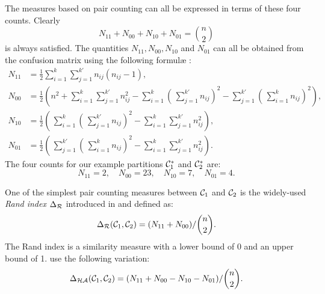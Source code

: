 The measures based on pair counting can all be expressed in terms of these
four counts.  Clearly \[N_{11}+N_{00}+N_{10}+N_{01} = \binom{n}{2}\] is always
satisfied.  The quantities $N_{11},N_{00},N_{10}$ and $N_{01}$ can all be
obtained from the confusion matrix using the following formul\ae
\citep{hubert-arabie-1985}:
\begin{align*}
  N_{11} &= \frac{1}{2} \sum_{i=1}^{k} \sum_{j=1}^{k'} n_{ij}(n_{ij}-1),\\
  N_{00} &= \frac{1}{2} \left(n^2 + \sum_{i=1}^{k} \sum_{j=1}^{k'} n_{ij}^2
                             - \sum_{i=1}^{k}
                                \left(\,\sum_{j=1}^{k'} n_{ij} \right)^2
                             - \sum_{j=1}^{k'}
                                \left(\,\sum_{i=1}^{k} n_{ij} \right)^2
                       \right),\\
  N_{10} &= \frac{1}{2} \left(\,\sum_{i=1}^{k}
                              \left(\,\sum_{j=1}^{k'} n_{ij} \right)^2
                             - \sum_{i=1}^{k} \sum_{j=1}^{k'} n_{ij}^2
                       \right),\\
  N_{01} &= \frac{1}{2} \left(\,\sum_{j=1}^{k'}
                              \left(\,\sum_{i=1}^{k} n_{ij} \right)^2
                             - \sum_{i=1}^{k} \sum_{j=1}^{k'} n_{ij}^2
                       \right).
\end{align*}
The four counts for our example partitions $\mathcal{C}^*_1$ and $\mathcal{C}^*_2$ are:
\begin{equation*}
  N_{11} = 2,\quad
  N_{00} = 23,\quad
  N_{10} = 7,\quad
  N_{01} = 4.
\end{equation*}

One of the simplest pair counting measures between $\mathcal{C}_1$ and $\mathcal{C}_2$ is
the widely-used \textit{Rand index} $\Delta_{\mathcal{R}}$ introduced in
\citep{rand-1971} and defined as:
\begin{equation*}
\Delta_{\mathcal{R}}(\mathcal{C}_1,\mathcal{C}_2) = (N_{11}+N_{00})/\binom{n}{2}.
\end{equation*}
The Rand index is a similarity measure with a lower bound of 0 and an upper
bound of 1.  \citet{hubert-arabie-1985} use the following variation:
\[\Delta_{\mathcal{HA}}(\mathcal{C}_1,\mathcal{C}_2) = (N_{11}+N_{00}-N_{10}-N_{01})/\binom{n}{2}.\]

